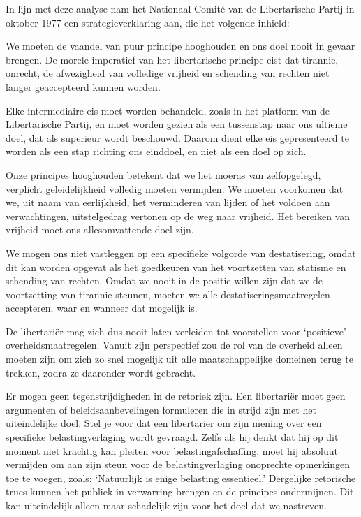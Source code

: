 \documentclass[
  a5paper,
  smalldemyvopaper,10pt,twoside,onecolumn,openright,extrafontsizes,hidelinks]{memoir}
\begin{document}
In lijn met deze analyse nam het Nationaal Comité van de Libertarische
Partij in oktober 1977 een strategieverklaring aan, die het volgende
inhield:

We moeten de vaandel van puur principe hooghouden en ons doel nooit in
gevaar brengen. De morele imperatief van het libertarische principe eist
dat tirannie, onrecht, de afwezigheid van volledige vrijheid en
schending van rechten niet langer geaccepteerd kunnen worden.

Elke intermediaire eis moet worden behandeld, zoals in het platform van
de Libertarische Partij, en moet worden gezien als een tussenstap naar
ons ultieme doel, dat als superieur wordt beschouwd. Daarom dient elke
eis gepresenteerd te worden als een stap richting ons einddoel, en niet
als een doel op zich.

Onze principes hooghouden betekent dat we het moeras van zelfopgelegd,
verplicht geleidelijkheid volledig moeten vermijden. We moeten voorkomen
dat we, uit naam van eerlijkheid, het verminderen van lijden of het
voldoen aan verwachtingen, uitstelgedrag vertonen op de weg naar
vrijheid. Het bereiken van vrijheid moet ons allesomvattende doel zijn.

We mogen ons niet vastleggen op een specifieke volgorde van
destatisering, omdat dit kan worden opgevat als het goedkeuren van het
voortzetten van statisme en schending van rechten. Omdat we nooit in de
positie willen zijn dat we de voortzetting van tirannie steunen, moeten
we alle destatiseringsmaatregelen accepteren, waar en wanneer dat
mogelijk is.

De libertariër mag zich dus nooit laten verleiden tot voorstellen voor
`positieve' overheidsmaatregelen. Vanuit zijn perspectief zou de rol van
de overheid alleen moeten zijn om zich zo snel mogelijk uit alle
maatschappelijke domeinen terug te trekken, zodra ze daaronder wordt
gebracht.

Er mogen geen tegenstrijdigheden in de retoriek zijn. Een libertariër
moet geen argumenten of beleidsaanbevelingen formuleren die in strijd
zijn met het uiteindelijke doel. Stel je voor dat een libertariër om
zijn mening over een specifieke belastingverlaging wordt gevraagd. Zelfs
als hij denkt dat hij op dit moment niet krachtig kan pleiten voor
belastingafschaffing, moet hij absoluut vermijden om aan zijn steun voor
de belastingverlaging onoprechte opmerkingen toe te voegen, zoals:
`Natuurlijk is enige belasting essentieel.' Dergelijke retorische trucs
kunnen het publiek in verwarring brengen en de principes ondermijnen.
Dit kan uiteindelijk alleen maar schadelijk zijn voor het doel dat we
nastreven.
\end{document}
